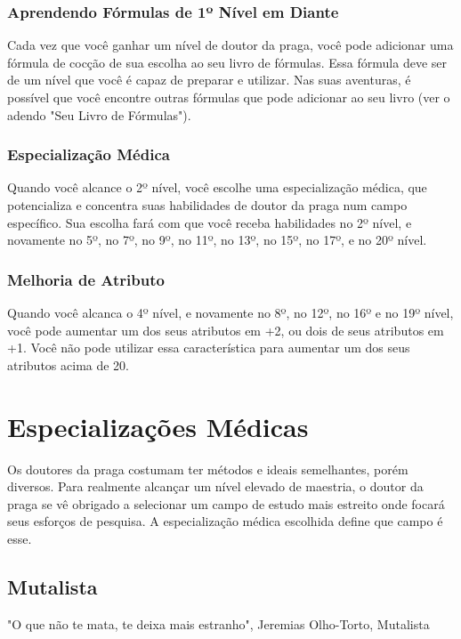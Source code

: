 \documentclass[letterpaper,twocolumn,openany]{dndbook}
\begin{document}
	\subsubsection{Aprendendo Fórmulas de 1º Nível em Diante}
	Cada vez que você ganhar um nível de doutor da praga, você pode adicionar uma fórmula de cocção de sua escolha ao seu livro de fórmulas. Essa fórmula deve ser de um nível que você é capaz de preparar e utilizar. Nas suas aventuras, é possível que você encontre outras fórmulas que pode adicionar ao seu livro (ver o adendo "Seu Livro de Fórmulas").
	
	\subsubsection{Especialização Médica}
	Quando você alcance o 2º nível, você escolhe uma especialização médica, que potencializa e concentra suas habilidades de doutor da praga num campo específico. Sua escolha fará com que você receba habilidades no 2º nível, e novamente no 5º, no 7º, no 9º, no 11º, no 13º, no 15º, no 17º, e no 20º nível.
	
	\subsubsection{Melhoria de Atributo}
	Quando você alcanca o 4º nível, e novamente no 8º, no 12º, no 16º e no 19º nível, você pode aumentar um dos seus atributos em +2, ou dois de seus atributos em +1. Você não pode utilizar essa característica para aumentar um dos seus atributos acima de 20.
	
	\section{Especializações Médicas}
	Os doutores da praga costumam ter métodos e ideais semelhantes, porém diversos. Para realmente alcançar um nível elevado de maestria, o doutor da praga se vê obrigado a selecionar um campo de estudo mais estreito onde focará seus esforços de pesquisa. A especialização médica escolhida define que campo é esse.
	
	\subsection{Mutalista}
	\begin{quotebox}
		"O que não te mata, te deixa mais estranho", Jeremias Olho-Torto, Mutalista
	\end{quotebox}
\end{document}
